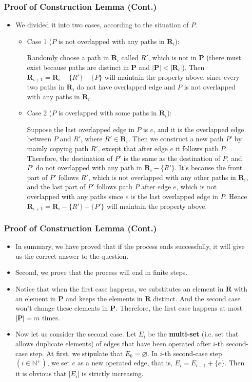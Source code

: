 \documentclass[notheorems]{beamer}
\begin{document}
\begin{frame}
\frametitle{Proof of Construction Lemma (Cont.)}
\begin{itemize}
\item We divided it into two cases, according to the situation of $P$.
\begin{itemize}
\item {\color{red} Case 1} ($P$ is not overlapped with any paths in $\mathbf{R}_i$):

Randomly choose a path in $\mathbf{R}_i$ called $R'$, which is not in $\mathbf{P}$ (there must exist because paths are distinct in $\mathbf{P}$ and $|\mathbf{P}| < |\mathbf{R}_i|$). Then $\mathbf{R}_{i+1} = \mathbf{R}_i - \{R'\} + \{P\}$ will maintain the {\color{blue}property} above, since every two paths in $\mathbf{R}_i$ do not have overlapped edge and $P$ is not overlapped with any paths in $\mathbf{R}_i$.
\item {\color{red} Case 2} ($P$ is overlapped with some paths in $\mathbf{R}_i$):

Suppose the last overlapped edge in $P$ is $e$, and it is the overlapped edge between $P$ and $R'$, where $R' \in \mathbf{R}_i$. Then we construct a new path $P'$ by mainly copying path $R'$, except that after edge $e$ it follows path $P$. Therefore, the destination of $P'$ is the same as the destination of $P$, and $P'$ do not overlapped with any path in $\mathbf{R}_i - \{R'\}$. It's because the front part of $P'$ follows $R'$, which is not overlapped with any other paths in $\mathbf{R}_i$, and the last part of $P'$ follows path $P$ after edge $e$, which is not overlapped with any paths since $e$ is the last overlapped edge in $P$. Hence $\mathbf{R}_{i+1} = \mathbf{R}_i - \{R'\} + \{P'\}$ will maintain the {\color{blue}property} above.
\end{itemize}
\end{itemize}
\end{frame}


\begin{frame}
\frametitle{Proof of Construction Lemma (Cont.)}
\begin{itemize}
\item In summary, we have proved that if the process ends successfully, it will give us the correct answer to the question.
\item Second, we prove that the process will end in finite steps.
\item Notice that when the first case happens, we substitutes an element in $\mathbf{R}$ with an element in $\mathbf{P}$ and keeps the elements in $\mathbf{R}$ distinct. And the second case won't change these elements in $\mathbf{P}$. Therefore, the first case happens at most $|\mathbf{P}| = m$ times.
\item Now let us consider the second case. Let $E_i$ be the \textbf{multi-set} (i.e. set that allows duplicate elements) of edges that have been operated after $i$-th second-case step. At first, we stipulate that $E_0 = \varnothing$. In $i$-th second-case step $(i\in\mathbb{N}^+)$, we set $e$ as a new operated edge, that is, $E_i = E_{i-1} + \{e\}$. Then it is obvious that $|E_i|$ is strictly increasing.
\end{itemize}
\end{frame}
\end{document}
